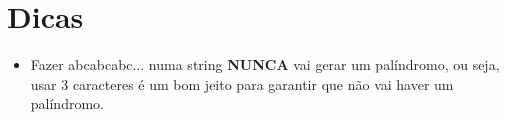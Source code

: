 \section{Dicas}
\begin{itemize}
    \item Fazer abcabcabc... numa string \textbf{NUNCA} vai gerar um palíndromo, ou seja, usar 3 caracteres é um bom jeito para garantir que não vai haver um palíndromo.
\end{itemize}